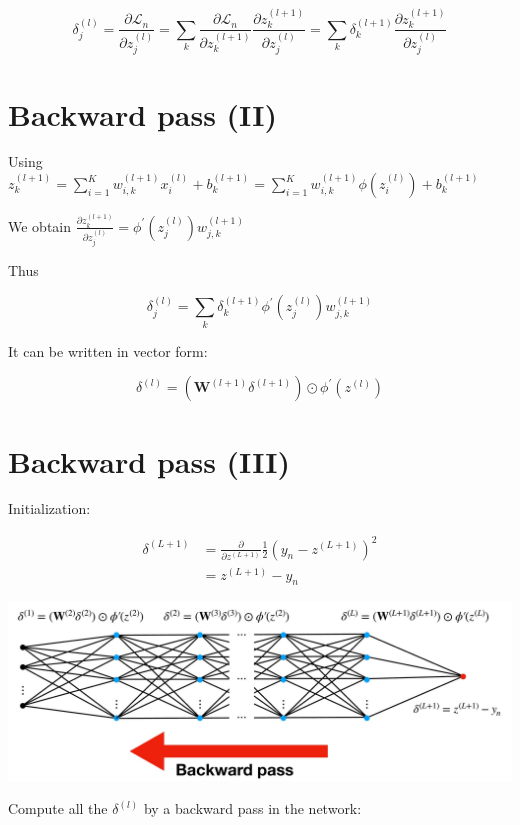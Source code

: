 \documentclass[10pt]{article}
\begin{document}
$$
\delta_{j}^{(l)}=\frac{\partial \mathscr{L}_{n}}{\partial z_{j}^{(l)}}=\sum_{k} \frac{\partial \mathscr{L}_{n}}{\partial z_{k}^{(l+1)}} \frac{\partial z_{k}^{(l+1)}}{\partial z_{j}^{(l)}}=\sum_{k} \delta_{k}^{(l+1)} \frac{\partial z_{k}^{(l+1)}}{\partial z_{j}^{(l)}}
$$

\section*{Backward pass (II)}
Using $z_{k}^{(l+1)}=\sum_{i=1}^{K} w_{i, k}^{(l+1)} x_{i}^{(l)}+b_{k}^{(l+1)}=\sum_{i=1}^{K} w_{i, k}^{(l+1)} \phi\left(z_{i}^{(l)}\right)+b_{k}^{(l+1)}$

We obtain $\frac{\partial z_{k}^{(l+1)}}{\partial z_{j}^{(l)}}=\phi^{\prime}\left(z_{j}^{(l)}\right) w_{j, k}^{(l+1)}$

Thus

$$
\delta_{j}^{(l)}=\sum_{k} \delta_{k}^{(l+1)} \phi^{\prime}\left(z_{j}^{(l)}\right) w_{j, k}^{(l+1)}
$$

It can be written in vector form:

$$
\delta^{(l)}=\left(\mathbf{W}^{(l+1)} \delta^{(l+1)}\right) \odot \phi^{\prime}\left(z^{(l)}\right)
$$

\section*{Backward pass (III)}
Initialization:

$$
\begin{aligned}
\delta^{(L+1)} & =\frac{\partial}{\partial z^{(L+1)}} \frac{1}{2}\left(y_{n}-z^{(L+1)}\right)^{2} \\
& =z^{(L+1)}-y_{n}
\end{aligned}
$$

\begin{center}
\includegraphics[max width=\textwidth]{2023_12_30_360102aa01a03e5a4270g-18}
\end{center}

Compute all the $\delta^{(l)}$ by a backward pass in the network:
\end{document}
